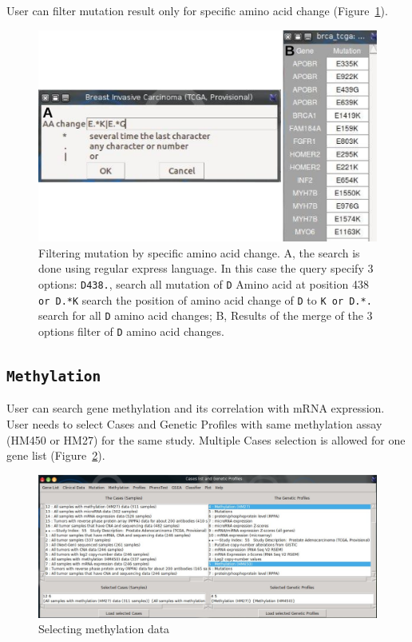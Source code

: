 \documentclass[a4paper]{article}
\begin{document}
User can filter mutation result only for specific amino acid change (Figure~\ref{Fig7}).


\begin{figure}[!ht]
 \centering
\includegraphics[scale=0.5]{image/specificMutation.png}
\caption{Filtering mutation by specific amino acid change. A, the search is done using regular express language. In this case the query specify 3 options: \texttt{D438.}, search all mutation of \texttt{D} Amino acid at position 438 \texttt{or D.*K} search the position of amino acid change of \texttt{D} to \texttt{K or D.*.} search for all \texttt{D} amino acid changes;  B, Results of the merge of the 3 options filter of \texttt{D} amino acid changes.}
\label{Fig7}
\end{figure}


\subsection{\texttt{Methylation}}

User can search gene methylation and its correlation with mRNA expression. User needs to select Cases and Genetic Profiles with same methylation assay (HM450 or HM27)  for the same study. Multiple Cases selection is allowed for one gene list (Figure~\ref{Fig8}).

\begin{figure}[!ht]
 \centering
\includegraphics[scale=1]{image/methylation.png}
\caption{Selecting methylation data}
\label{Fig8}
\end{figure}
\end{document}
